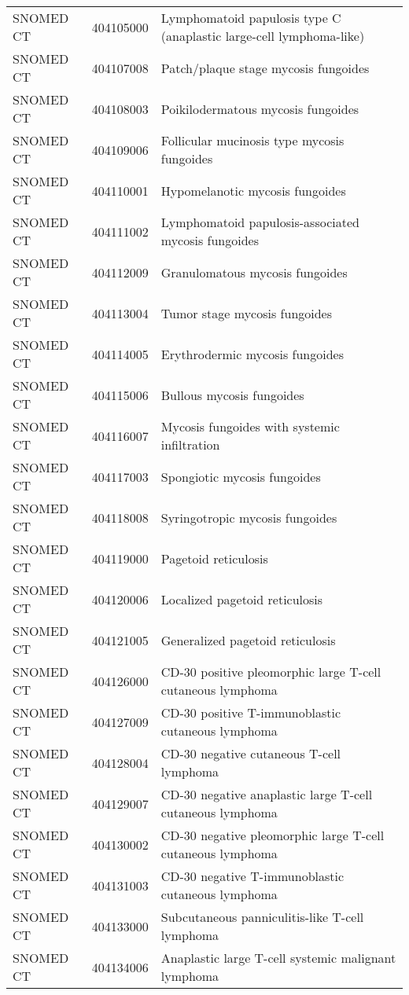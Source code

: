 \begin{longtable}{p{}p{}p{}}
  SNOMED CT & 404105000 & Lymphomatoid papulosis type C (anaplastic large-cell lymphoma-like) \\ 
  SNOMED CT & 404107008 & Patch/plaque stage mycosis fungoides \\ 
  SNOMED CT & 404108003 & Poikilodermatous mycosis fungoides \\ 
  SNOMED CT & 404109006 & Follicular mucinosis type mycosis fungoides \\ 
  SNOMED CT & 404110001 & Hypomelanotic mycosis fungoides \\ 
  SNOMED CT & 404111002 & Lymphomatoid papulosis-associated mycosis fungoides \\ 
  SNOMED CT & 404112009 & Granulomatous mycosis fungoides \\ 
  SNOMED CT & 404113004 & Tumor stage mycosis fungoides \\ 
  SNOMED CT & 404114005 & Erythrodermic mycosis fungoides \\ 
  SNOMED CT & 404115006 & Bullous mycosis fungoides \\ 
  SNOMED CT & 404116007 & Mycosis fungoides with systemic infiltration \\ 
  SNOMED CT & 404117003 & Spongiotic mycosis fungoides \\ 
  SNOMED CT & 404118008 & Syringotropic mycosis fungoides \\ 
  SNOMED CT & 404119000 & Pagetoid reticulosis \\ 
  SNOMED CT & 404120006 & Localized pagetoid reticulosis \\ 
  SNOMED CT & 404121005 & Generalized pagetoid reticulosis \\ 
  SNOMED CT & 404126000 & CD-30 positive pleomorphic large T-cell cutaneous lymphoma \\ 
  SNOMED CT & 404127009 & CD-30 positive T-immunoblastic cutaneous lymphoma \\ 
  SNOMED CT & 404128004 & CD-30 negative cutaneous T-cell lymphoma \\ 
  SNOMED CT & 404129007 & CD-30 negative anaplastic large T-cell cutaneous lymphoma \\ 
  SNOMED CT & 404130002 & CD-30 negative pleomorphic large T-cell cutaneous lymphoma \\ 
  SNOMED CT & 404131003 & CD-30 negative T-immunoblastic cutaneous lymphoma \\ 
  SNOMED CT & 404133000 & Subcutaneous panniculitis-like T-cell lymphoma \\ 
  SNOMED CT & 404134006 & Anaplastic large T-cell systemic malignant lymphoma \\ 

\end{longtable}
